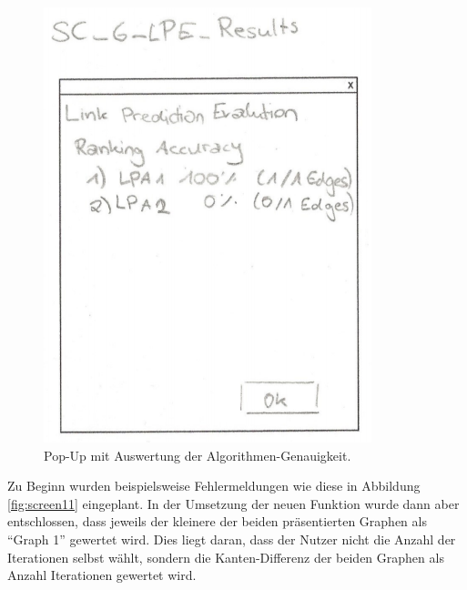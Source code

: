 \begin{figure}
    \includegraphics[width=\linewidth]{resources/EV-4.png}
    \caption{Pop-Up mit Auswertung der Algorithmen-Genauigkeit.}
    \label{fig:screen10}
\end{figure}

Zu Beginn wurden beispielsweise Fehlermeldungen wie diese in Abbildung \ref{fig:screen11} eingeplant. In der Umsetzung
der neuen Funktion wurde dann aber entschlossen, dass jeweils der kleinere der beiden präsentierten Graphen als ``Graph 1''
gewertet wird. Dies liegt daran, dass der Nutzer nicht die Anzahl der Iterationen selbst wählt, sondern die
Kanten-Differenz der beiden Graphen als Anzahl Iterationen gewertet wird.

